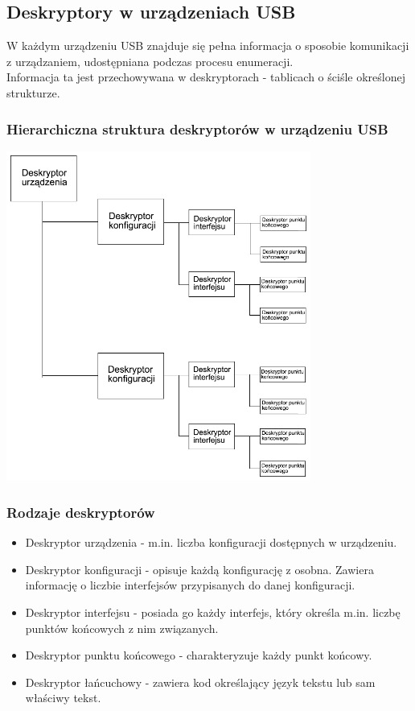 \subsection{Deskryptory w urządzeniach USB}
	W każdym urządzeniu USB znajduje się pełna informacja o sposobie komunikacji z urządzaniem, udostępniana podczas procesu enumeracji.\\
	Informacja ta jest przechowywana w deskryptorach - tablicach o ściśle określonej strukturze.
	\subsubsection{Hierarchiczna struktura deskryptorów w urządzeniu USB}
	\includegraphics[width=10cm]{./wyklady/USB_24_1.pdf}
	\subsubsection{Rodzaje deskryptorów}
	\begin{itemize}
		\item Deskryptor urządzenia - m.in. liczba konfiguracji dostępnych w urządzeniu.
		\item Deskryptor konfiguracji - opisuje każdą konfigurację z osobna. Zawiera informację o liczbie interfejsów przypisanych do danej konfiguracji.
		\item Deskryptor interfejsu - posiada go każdy interfejs, który określa m.in. liczbę punktów końcowych z nim związanych.
		\item Deskryptor punktu końcowego - charakteryzuje każdy punkt końcowy.
		\item Deskryptor łańcuchowy - zawiera kod określający język tekstu lub sam właściwy tekst.
	\end{itemize}
	
